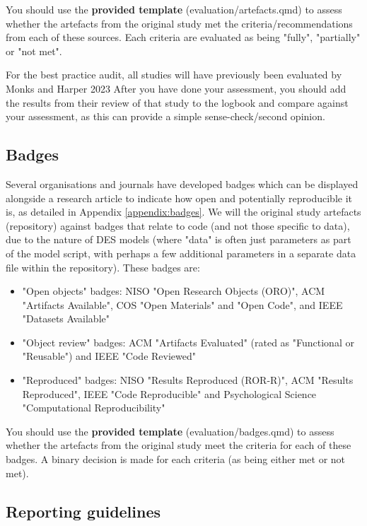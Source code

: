 You should use the \textbf{provided template} (evaluation/artefacts.qmd) to assess whether the artefacts from the original study met the criteria/recommendations from each of these sources. Each criteria are evaluated as being "fully", "partially" or "not met".

For the best practice audit, all studies will have previously been evaluated by Monks and Harper 2023\autocite{monks_computer_2023} After you have done your assessment, you should add the results from their review of that study to the logbook and compare against your assessment, as this can provide a simple sense-check/second opinion.

\vspace{0.5cm}
\subsection{Badges} \label{sec:badges}

Several organisations and journals have developed badges which can be displayed alongside a research article to indicate how open and potentially reproducible it is, as detailed in Appendix \ref{appendix:badges}. We will the original study artefacts (repository) against badges that relate to code (and not those specific to data), due to the nature of DES models (where "data" is often just parameters as part of the model script, with perhaps a few additional parameters in a separate data file within the repository). These badges are:
\begin{itemize}
    \item "Open objects" badges: NISO "Open Research Objects (ORO)", ACM "Artifacts Available", COS "Open Materials" and "Open Code", and IEEE "Datasets Available"
    \item "Object review" badges: ACM "Artifacts Evaluated" (rated as "Functional or "Reusable") and IEEE "Code Reviewed"
    \item "Reproduced" badges: NISO "Results Reproduced (ROR-R)", ACM "Results Reproduced", IEEE "Code Reproducible" and Psychological Science "Computational Reproducibility"
\end{itemize}

You should use the \textbf{provided template} (evaluation/badges.qmd) to assess whether the artefacts from the original study meet the criteria for each of these badges. A binary decision is made for each criteria (as being either met or not met).

\subsection{Reporting guidelines} \label{sec:reporting}

